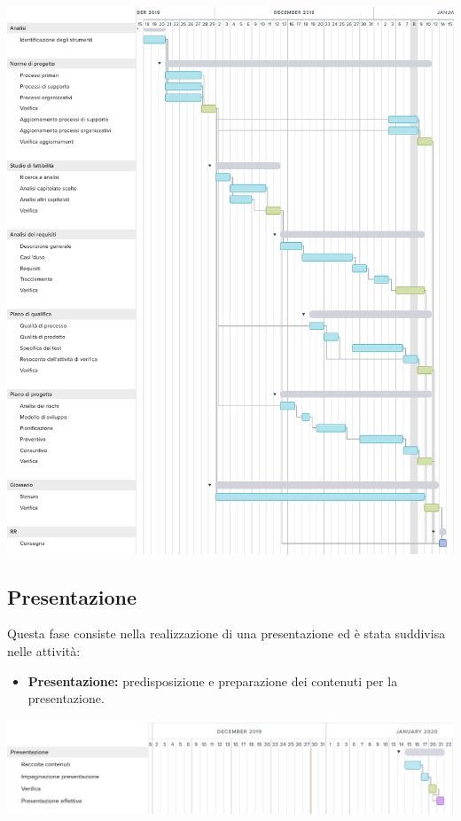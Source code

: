 \includegraphics[width=\textwidth]{res/img/g1113}
\subsection{Presentazione}
Questa fase consiste nella realizzazione di una presentazione ed è stata suddivisa nelle attività:
\begin{itemize}
	\item \textbf{Presentazione:} predisposizione e preparazione dei contenuti per la presentazione.
\end{itemize}
\includegraphics[width=\textwidth]{res/img/g2}
